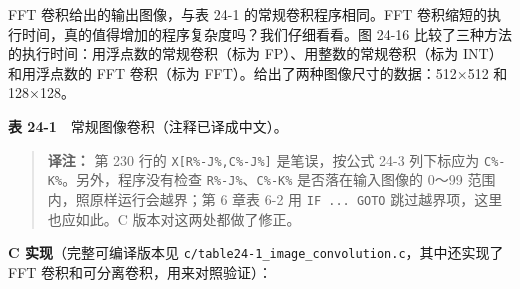 FFT 卷积给出的输出图像，与表 24-1 的常规卷积程序相同。FFT
卷积缩短的执行时间，真的值得增加的程序复杂度吗？我们仔细看看。图 24-16
比较了三种方法的执行时间：用浮点数的常规卷积（标为
FP）、用整数的常规卷积（标为 INT）和用浮点数的 FFT 卷积（标为
FFT）。给出了两种图像尺寸的数据：512×512 和 128×128。

\textbf{表 24-1}　常规图像卷积（注释已译成中文）。

\begin{Shaded}
\begin{Highlighting}[]
\NormalTok{110 \textquotesingle{}}
\NormalTok{150 \textquotesingle{}}
\NormalTok{180 \textquotesingle{}}
\NormalTok{200 \textquotesingle{}}
\NormalTok{260 \textquotesingle{}}
\NormalTok{290 \textquotesingle{}}
\end{Highlighting}
\end{Shaded}

\begin{quote}
\textbf{译注：} 第 230 行的 \texttt{X{[}R\%-J\%,C\%-J\%{]}}
是笔误，按公式 24-3 列下标应为 \texttt{C\%-K\%}。另外，程序没有检查
\texttt{R\%-J\%}、\texttt{C\%-K\%} 是否落在输入图像的 0～99
范围内，照原样运行会越界；第 6 章表 6-2 用 \texttt{IF\ ...\ GOTO}
跳过越界项，这里也应如此。C 版本对这两处都做了修正。
\end{quote}

\textbf{C 实现}（完整可编译版本见
\texttt{c/table24-1\_image\_convolution.c}，其中还实现了 FFT
卷积和可分离卷积，用来对照验证）：


